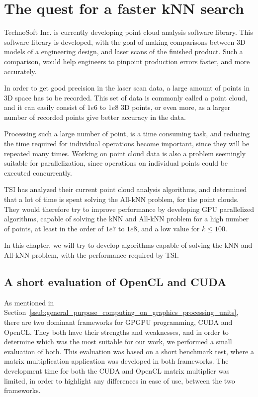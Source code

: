 
\chapter{The quest for a faster kNN search} %
\label{sec:the_quest_for_a_faster_knn_search}

TechnoSoft Inc. is currently developing point cloud analysis software library. This software library is developed, with the goal of making comparisons between 3D models of a engineering design, and laser scans of the finished product. Such a comparison, would help engineers to pinpoint production errors faster, and more accurately.

In order to get good precision in the laser scan data, a large amount of points in 3D space has to be recorded. This set of data is commonly called a point cloud, and it can easily consist of $1e6$ to $1e8$ 3D points, or even more, as a larger number of recorded points give better accuracy in the data.

Processing such a large number of point, is a time consuming task, and reducing the time required for individual operations become important, since they will be repeated many times. Working on point cloud data is also a problem seemingly suitable for parallelization, since operations on individual points could be executed concurrently.

TSI has analyzed their current point cloud analysis algorithms, and determined that a lot of time is spent solving the All-kNN problem, for the point clouds. They would therefore try to improve performance by developing GPU parallelized algorithms, capable of solving the kNN and All-kNN problem for a high number of points, at least in the order of $1e7$ to $1e8$, and a low value for $k\le100$.

In this chapter, we will try to develop algorithms capable of solving the kNN and All-kNN problem, with the performance required by TSI.

\section{A short evaluation of OpenCL and CUDA} %
\label{sub:a_short_evaluation_of_opencl_and_cuda}

As mentioned in Section~\ref{ssub:general_purpose_computing_on_graphics_processing_units}, there are two dominant frameworks for GPGPU programming, CUDA and OpenCL\@. They both have their strengths and weaknesses, and in order to determine which was the most suitable for our work, we performed a small evaluation of both. This evaluation was based on a short benchmark test, where a matrix multiplication application was developed in both frameworks. The development time for both the CUDA and OpenCL matrix multiplier was limited, in order to highlight any differences in ease of use, between the two frameworks.

